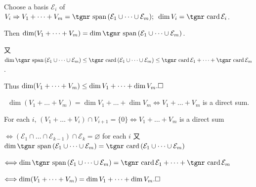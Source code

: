 \documentclass[a4paper, 11pt, UTF8]{article}
\def\card{{\textup{\tgnr card}}\,}
\def\Spn{{\textup{\tgnr span}}\,}
\begin{document}
\begin{large}
\par\quad
Choose a basis $ \mathcal{E}_i$ of $V_i\Rightarrow V_1+\dots+V_m=\Spn( \mathcal{E}_1\cup\cdots\cup \mathcal{E}_m);\,\,\,\dim V_i=\card \mathcal{E}_i$.\par\quad
Then $\dim(V_1+\dots+V_m)=\dim\Spn( \mathcal{E}_1\cup\cdots\cup \mathcal{E}_m)$.\par\quad
又 $\dim\Spn(\mathcal{E}_1\cup\cdots\cup\mathcal{E}_m)\leq\card( \mathcal{E}_1\cup\cdots\cup \mathcal{E}_m)\leq\card \mathcal{E}_1+\cdots+\card \mathcal{E}_m$.\par\quad
Thus $\dim(V_1+\dots+V_m)\leq \dim V_1+\dots+\dim V_m.\hfill\square$\vspace{6pt}\par\quad
\Comment \,\,\,{\tgsl\Large$\dim(V_1+\dots+V_m)=\dim V_1+\dots+\dim V_m\Longleftrightarrow V_1+\dots+V_m$ is a direct sum.}\par\quad\Blind{\Comment\,\,}
For each $i$, $(V_1+\dots+V_i)\cap V_{i+1}=\{0\}\Longleftrightarrow V_1+\dots+V_m$ is a direct sum\par\quad\Blind{\Comment\,\,}
$\Longleftrightarrow(\mathcal{E}_1\cap\dots\cap\mathcal{E}_{k-1})\cap\mathcal{E}_k=\varnothing$ for each $i$ 又 $\dim\Spn(\mathcal{E}_1\cup\dots\cup\mathcal{E}_m)=\card(\mathcal{E}_1\cup\dots\cup\mathcal{E}_m)$\par\quad\Blind{\Comment\,\,}
$\Longleftrightarrow\dim\Spn(\mathcal{E}_1\cup\dots\cup\mathcal{E}_m)=\card\mathcal{E}_1+\dots+\card\mathcal{E}_m$\par\quad\Blind{\Comment\,\,}
$\Longleftrightarrow\dim(V_1+\dots+V_m)=\dim V_1+\dots+\dim V_m.\hfill\square$\par
\SepLine\par


\end{large}
\end{document}
